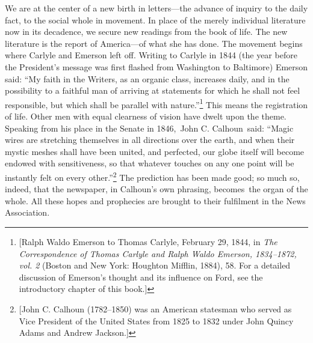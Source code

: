 \documentclass[twoside,symmetric,nobib,justified]{tufte-book}
\begin{document}
We are at the center of a new birth in letters---the advance of inquiry
to the daily fact, to the social whole in movement. In place of the
merely individual literature now in its decadence, we secure new
readings from the book of life. The new literature is the report of
America---of what she has done. The movement begins where Carlyle and
Emerson left off. Writing to Carlyle in 1844 (the year before the
President's message was first flashed from Washington to Baltimore)
Emerson said: ``My faith in the Writers, as an organic class, increases
daily, and in the possibility to a faithful man of arriving at
statements for which he shall not feel responsible, but which shall be
parallel with nature.''\footnote{{[}Ralph Waldo Emerson to Thomas
  Carlyle, February 29, 1844, in \emph{The Correspondence of Thomas
  Carlyle and Ralph Waldo Emerson, 1834--1872, vol. 2} (Boston and New
  York: Houghton Mifflin, 1884), \emph{} 58. For a detailed discussion
  of Emerson's thought and its influence on Ford, see the introductory
  chapter of this book.{]}} This means the registration of life. Other
men with equal clearness of vision have dwelt upon the theme. Speaking
from his place in the Senate in 1846,~John C. Calhoun~said: ``Magic
wires are stretching themselves in all directions over the earth, and
when their mystic meshes shall have been united, and perfected, our
globe itself will become endowed with sensitiveness, so that whatever
touches on any one point will be instantly felt on every
other.''\footnote{{[}John C. Calhoun (1782--1850) was an American
  statesman who served as Vice President of the United States from 1825
  to 1832 under John Quincy Adams and Andrew Jackson.{]}} The prediction
has been made good; so much so, indeed, that the newspaper, in Calhoun's
own phrasing, becomes~the organ of the whole. All these hopes and
prophecies are brought to their fulfilment in the News Association.~

\enlargethispage{\baselineskip}
\end{document}
